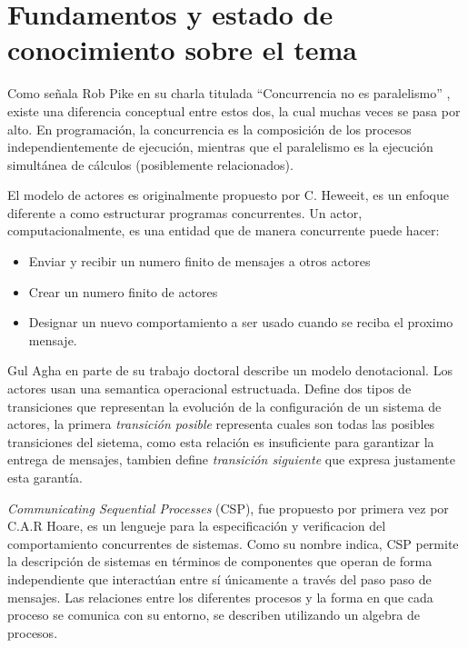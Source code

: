 \documentclass{article}
\begin{document}
\section{Fundamentos y estado de conocimiento sobre el tema}
 
Como señala Rob Pike en su charla titulada ``Concurrencia no es paralelismo'' \cite{rpike13_cnp}, existe una diferencia conceptual entre estos dos, la cual muchas veces se pasa por alto. En programación, la concurrencia es la composición de los procesos independientemente de ejecución, mientras que el paralelismo es la ejecución simultánea de cálculos (posiblemente relacionados). 

El modelo de actores es originalmente propuesto por C. Heweeit\cite{Wyatt:2013:AC:2663429}, es un enfoque diferente a como estructurar programas concurrentes. Un actor, computacionalmente, es una entidad que de manera concurrente puede hacer:

\begin{itemize}
\item Enviar y recibir un numero finito de mensajes a otros actores
\item Crear un numero finito de actores
\item Designar un nuevo comportamiento a ser usado cuando se reciba el proximo mensaje.
\end{itemize}

Gul Agha\cite{Agha:1986:AMC:7929} en parte de su trabajo doctoral describe un modelo denotacional. Los actores usan una semantica operacional estructuada\cite{Plotkin81astructural}. Define dos tipos de transiciones que representan la evolución de la configuración de un sistema de actores, la primera \emph{transición posible} representa cuales son todas las posibles transiciones del sietema, como esta relación es insuficiente para garantizar la entrega de mensajes, tambien define \emph{transición siguiente} que expresa justamente esta garantía.

\emph{Communicating Sequential Processes} (CSP), fue propuesto por primera vez por C.A.R Hoare\cite{Hoare:1978:CSP:359576.359585}, es un lengueje para la especificación y verificacion del comportamiento concurrentes de sistemas. Como su nombre indica, CSP permite la descripción de sistemas en términos de componentes que operan de forma independiente que interactúan entre sí únicamente a través del paso paso de mensajes. Las relaciones entre los diferentes procesos y la forma en que cada proceso se comunica con su entorno, se describen utilizando un algebra de procesos.
\end{document}
